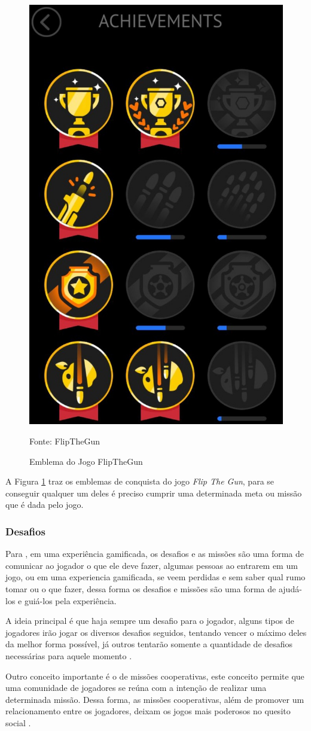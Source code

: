 		\begin{figure}[H]
			\centering
			\includegraphics[width=0.3\linewidth]{img/EmblemasFLIPTHEGUN}
			\caption{Emblema do Jogo FlipTheGun}	
			Fonte: FlipTheGun
			\label{emblemasFlipTheGun}
	   \end{figure}	
   		A Figura \ref{emblemasFlipTheGun} traz os emblemas de conquista do jogo \textit{Flip The Gun}, para se conseguir qualquer um deles é preciso cumprir uma determinada meta ou missão que é dada pelo jogo.
		\subsubsection{Desafios}
		Para , em uma experiência gamificada, os desafios e as missões são uma forma de comunicar ao jogador o que ele deve fazer, algumas pessoas ao entrarem em um jogo, ou em uma experiencia gamificada, se veem perdidas e sem saber qual rumo tomar ou o que fazer, dessa forma os desafios e missões são uma forma de ajudá-los e guiá-los pela experiência.
		
		A ideia principal é que haja sempre um desafio para o jogador, alguns tipos de jogadores irão jogar os diversos desafios seguidos, tentando vencer o máximo deles da melhor forma possível, já outros tentarão somente a quantidade de desafios necessárias para aquele momento \cite{zichermann2011gamification}.
		
		Outro conceito importante é o de missões cooperativas, este conceito permite que uma comunidade de jogadores se reúna com a intenção de realizar uma determinada missão. Dessa forma, as missões cooperativas, além de promover um relacionamento entre os jogadores, deixam os jogos mais poderosos no quesito social \cite{zichermann2011gamification}.
		
